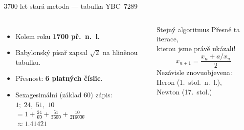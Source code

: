 \documentclass[12pt]{beamer}
\begin{document}
\begin{frame}{3700 let stará metoda --- tabulka YBC~7289}

    \begin{columns}
        \begin{itemize}
            \item Kolem roku \textbf{1700 př.~n.~l.}
            \pause
            \item Babylonský písař zapsal $\sqrt{2}$
                  na hliněnou tabulku.
            \item Přesnost: \textbf{6 platných číslic}.
            \pause
            \item Sexagesimální (základ 60) zápis:\\
                  $1;\; 24,\; 51,\; 10$\\
                  $= 1 + \tfrac{24}{60} + \tfrac{51}{3600}
                    + \tfrac{10}{216000}$\\
                  $\approx \num{1.41421}$
        \end{itemize}

        \begin{alertblock}{Stejný algoritmus}
            Přesně ta iterace,\\
            kterou jsme právě ukázali!
            \[
                x_{n+1} = \frac{x_n + a/x_n}{2}
            \]
            Nezávisle znovuobjevena:\\
            Heron (1.~stol.\ n.~l.),\\
            Newton (17.~stol.)
        \end{alertblock}
    \end{columns}

\end{frame}
\end{document}
